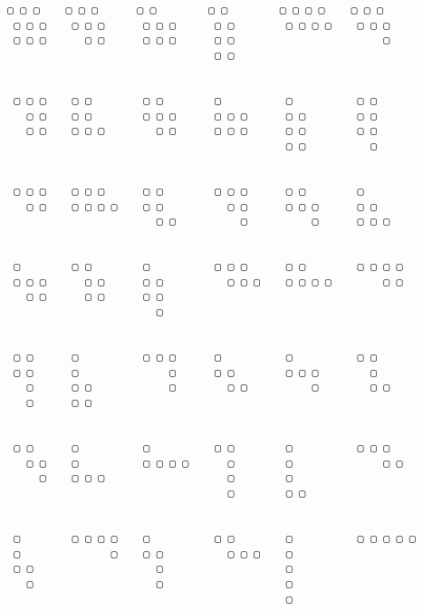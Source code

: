 \begin{table}
\begin{Verbatim}[baselinestretch=0.5]
 ▢ ▢ ▢    ▢ ▢ ▢      ▢ ▢        ▢ ▢        ▢ ▢ ▢ ▢    ▢ ▢ ▢
 ▢ ▢ ▢    ▢ ▢ ▢      ▢ ▢ ▢      ▢ ▢        ▢ ▢ ▢ ▢    ▢ ▢ ▢
 ▢ ▢ ▢      ▢ ▢      ▢ ▢ ▢      ▢ ▢                       ▢
                                ▢ ▢


 ▢ ▢ ▢    ▢ ▢        ▢ ▢        ▢          ▢          ▢ ▢
   ▢ ▢    ▢ ▢        ▢ ▢ ▢      ▢ ▢ ▢      ▢ ▢        ▢ ▢
   ▢ ▢    ▢ ▢ ▢        ▢ ▢      ▢ ▢ ▢      ▢ ▢        ▢ ▢
                                           ▢ ▢          ▢


 ▢ ▢ ▢    ▢ ▢ ▢      ▢ ▢        ▢ ▢ ▢      ▢ ▢        ▢
   ▢ ▢    ▢ ▢ ▢ ▢    ▢ ▢          ▢ ▢      ▢ ▢ ▢      ▢ ▢
                       ▢ ▢          ▢          ▢      ▢ ▢ ▢


 ▢        ▢ ▢        ▢          ▢ ▢ ▢      ▢ ▢        ▢ ▢ ▢ ▢
 ▢ ▢ ▢      ▢ ▢      ▢ ▢          ▢ ▢ ▢    ▢ ▢ ▢ ▢        ▢ ▢
   ▢ ▢      ▢ ▢      ▢ ▢
                       ▢


 ▢ ▢      ▢          ▢ ▢ ▢      ▢          ▢          ▢ ▢
 ▢ ▢      ▢              ▢      ▢ ▢        ▢ ▢ ▢        ▢
   ▢      ▢ ▢            ▢        ▢ ▢          ▢        ▢ ▢
   ▢      ▢ ▢


 ▢ ▢      ▢          ▢          ▢ ▢        ▢          ▢ ▢ ▢
   ▢ ▢    ▢          ▢ ▢ ▢ ▢      ▢        ▢              ▢ ▢
     ▢    ▢ ▢ ▢                   ▢        ▢
                                  ▢        ▢ ▢


 ▢        ▢ ▢ ▢ ▢    ▢          ▢ ▢        ▢          ▢ ▢ ▢ ▢ ▢
 ▢              ▢    ▢ ▢          ▢ ▢ ▢    ▢
 ▢ ▢                   ▢                   ▢
   ▢                   ▢                   ▢
                                           ▢
\end{Verbatim}
\caption{Parallelogram Polyominoes with semiperimeter $6$,
which are $42$ in total, the $6$th Catalan number.}
\label{tbl:parallelogram:polyominoes}
\end{table}

